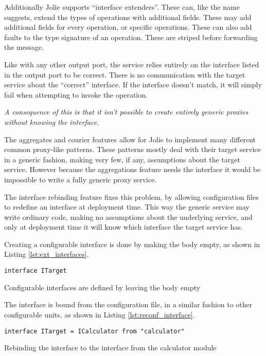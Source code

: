Additionally Jolie supports ``interface extenders''. These can, like the name
suggests, extend the types of operations with additional fields. These may add
additional fields for every operation, or specific operations. These can also
add faults to the type signature of an operation. These are striped before
forwarding the message.

Like with any other output port, the service relies entirely on the interface
listed in the output port to be correct. There is no communication with the
target service about the ``correct'' interface. If the interface doesn't match,
       it will simply fail when attempting to invoke the operation.

\emph{A consequence of this is that it isn't possible to create entirely generic
proxies without knowing the interface.}

The aggregates and courier features allow for Jolie to implement many different
common proxy-like patterns. These patterns mostly deal with their target
service in a generic fashion, making very few, if any, assumptions about the
target service. However because the aggregations feature needs the interface it
would be impossible to write a fully generic proxy service.

The interface rebinding feature fixes this problem, by allowing configuration
files to redefine an interface at deployment time. This way the generic service
may write ordinary code, making no assumptions about the underlying service,
and only at deployment time it will know which interface the target service
has.

Creating a configurable interface is done by making the body empty, as shown in
Listing \ref{lst:ext_interfaces}.


\begin{listing}[H]
\begin{verbatim}
interface ITarget
\end{verbatim}
\caption{Configurable interfaces are defined by leaving the body empty}
\label{lst:ext_interfaces}
\end{listing}

The interface is bound from the configuration file, in a similar fashion to
other configurable units, as shown in Listing \ref{lst:reconf_interface}.

\begin{listing}[H]
\begin{verbatim}
interface ITarget = ICalculator from "calculator"
\end{verbatim}

\caption{Rebinding the  interface to the 
    interface from the calculator module}

\label{lst:reconf_interface}
\end{listing}

